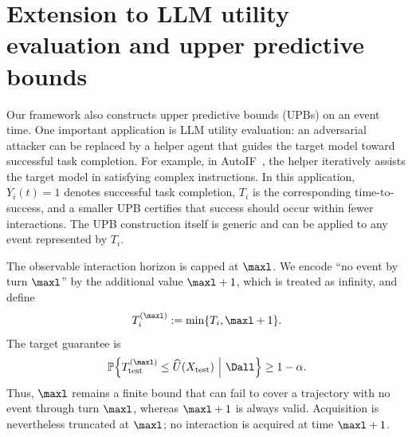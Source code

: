 
\section{Extension to LLM utility evaluation and upper predictive bounds}
\label{sec:utility_upb}

Our framework also constructs upper predictive bounds (UPBs) on an event
time. One important application is LLM utility evaluation: an adversarial
attacker can be replaced by a helper agent that guides the target model toward
successful task completion. For example, in AutoIF~\citep{dong2025selfplay},
the helper iteratively assists the target model in satisfying complex
instructions. In this application, $Y_i(t)=1$ denotes successful task
completion, $T_i$ is the corresponding time-to-success, and a smaller UPB
certifies that success should occur within fewer interactions. The UPB
construction itself is generic and can be applied to any event represented by
$T_i$.

The observable interaction horizon is capped at $\maxl$. We encode ``no event
by turn $\maxl$'' by the additional value $\maxl+1$, which is treated as
infinity, and define
\[
    T_i^{(\maxl)}:=\min\{T_i,\maxl+1\}.
\]
The target guarantee is
\begin{equation}
    \mathbb P\!\left\{
        T_{\mathrm{test}}^{(\maxl)}
        \leq \widehat U(X_{\mathrm{test}})
        \ \middle|\ \Dall
    \right\}
    \geq 1-\alpha.
    \label{eq:upb_target}
\end{equation}
Thus, $\maxl$ remains a finite bound that can fail to cover a trajectory with
no event through turn $\maxl$, whereas $\maxl+1$ is always valid. Acquisition
is nevertheless truncated at $\maxl$; no interaction is acquired at time
$\maxl+1$.

